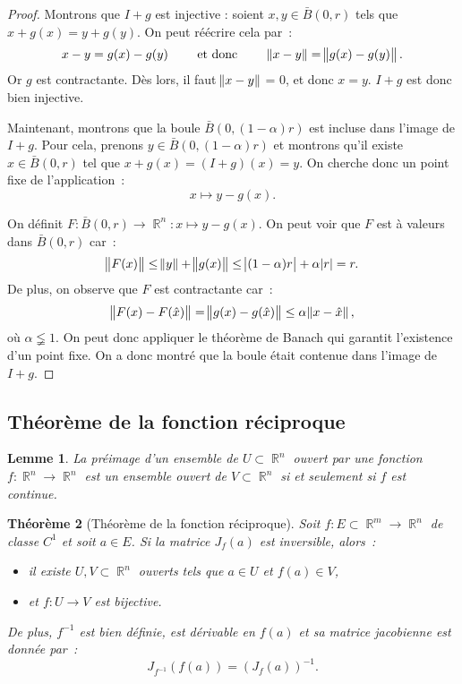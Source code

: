 \documentclass{article}
\DeclareMathOperator{\R}{\mathbb R}
\newtheorem{thm}{Théorème}[section]
\newtheorem{lem}[thm]{Lemme}
\theoremstyle{definition}
\theoremstyle{remark}
\begin{document}
		\begin{proof} Montrons que $I+g$ est injective : soient $x, y \in \bar B(0, r)$ tels que $x+g(x) = y+g(y)$. On peut réécrire cela par~:
		\[x-y = g(x)-g(y)\qquad\text{ et donc }\qquad\norm{x-y}=\norm{g(x)-g(y)}.\]
		Or $g$ est contractante. Dès lors, il faut $\norm {x-y}$ = 0, et donc $x=y$. $I+g$ est donc bien injective.

		Maintenant, montrons que la boule $\bar B(0, (1-\alpha)r)$ est incluse dans l'image de $I+g$. Pour cela, prenons $y \in \bar B(0, (1-\alpha)r)$ et
		montrons qu'il existe $x \in \bar B(0, r)$ tel que $x + g(x) = (I+g)(x) = y$. On cherche donc un point fixe de l'application~:
		\[x \mapsto y-g(x).\]

		On définit $F : \bar B(0, r) \to \R^n : x \mapsto y-g(x)$. On peut voir que $F$ est à valeurs dans $\bar B(0, r)$ car~:
		\[\norm {F(x)} \leq \norm y + \norm {g(x)} \leq \abs{(1-\alpha)r} + \alpha\abs r = r.\]
		De plus, on observe que $F$ est contractante car~:
		\[\norm {F(x) - F(\hat x)} = \norm {g(x) -g(\hat x)} \leq \alpha\norm {x-\hat x},\]
		où $\alpha \lneqq 1$. On peut donc appliquer le théorème de Banach qui garantit l'existence d'un point fixe. On a donc montré que la boule était
		contenue dans l'image de $I+g$.
		\end{proof}

	\subsection{Théorème de la fonction réciproque}
		\begin{lem}\label{lem:préimageouvertparcontinuestouvert} La préimage d'un ensemble de $U \subset \R^n$ ouvert par une fonction $f : \R^n \to \R^n$ est
		un ensemble ouvert de $V \subset \R^n$ si et seulement si $f$ est continue.
		\end{lem}

		\begin{thm}[Théorème de la fonction réciproque] Soit $f : E \subset \R^m \to \R^n$ de classe $C^1$ et soit $a \in E$. Si la matrice $J_f(a)$ est
		inversible, alors~:
		\begin{itemize}
			\item il existe $U, V \subset \R^n$ ouverts tels que $a \in U$ et $f(a) \in V$,
			\item et $f : U \to V$ est bijective.
		\end{itemize}

		De plus, $f^{-1}$ est bien définie, est dérivable en $f(a)$ et sa matrice jacobienne est donnée par~:
		\[J_{f^{-1}}(f(a)) = (J_f(a))^{-1}.\]
		\end{thm}
\end{document}
